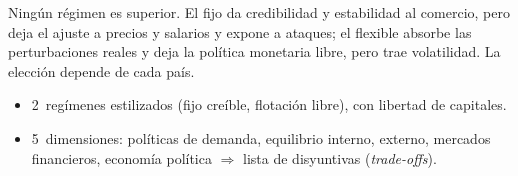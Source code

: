 \documentclass{article}
\begin{document}
\begin{columnas}

\begin{ideaclave}
Ningún régimen es superior. El fijo da credibilidad y estabilidad al comercio, pero deja el ajuste a precios y salarios y expone a ataques; el flexible absorbe las perturbaciones reales y deja la política monetaria libre, pero trae volatilidad. La elección depende de cada país.
\end{ideaclave}

\begin{itemize}
\item 2~regímenes estilizados (fijo creíble, flotación libre), con libertad de capitales.
\item 5~dimensiones: políticas de demanda, equilibrio interno, externo, mercados financieros, economía política $\Rightarrow$ lista de disyuntivas (\emph{trade-offs}).
\end{itemize}


\end{columnas}
\end{document}
